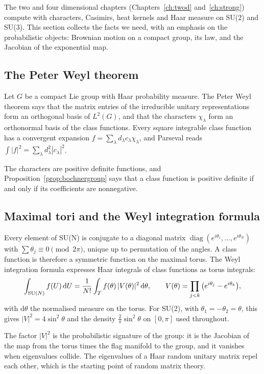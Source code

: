 The two and four dimensional chapters (Chapters~\ref{ch:twod} and~\ref{ch:strong}) compute with characters, Casimirs, heat kernels and Haar measure on SU(2) and SU(3). This section collects the facts we need, with an emphasis on the probabilistic objects: Brownian motion on a compact group, its law, and the Jacobian of the exponential map.

\subsection{The Peter Weyl theorem}\label{sec:peterweyl}

Let $G$ be a compact Lie group with Haar probability measure. The Peter Weyl theorem says that the matrix entries of the irreducible unitary representations form an orthogonal basis of $L^2(G)$, and that the characters $\chi_\lambda$ form an orthonormal basis of the class functions. Every square integrable class function has a convergent expansion $f=\sum_\lambda d_\lambda c_\lambda\chi_\lambda$, and Parseval reads $\int|f|^2=\sum_\lambda d_\lambda^2|c_\lambda|^2$.

The characters are positive definite functions, and Proposition~\ref{prop:bochnergroup} says that a class function is positive definite if and only if its coefficients are nonnegative.

\subsection{Maximal tori and the Weyl integration formula}\label{sec:weylint}

Every element of SU(N) is conjugate to a diagonal matrix $\operatorname{diag}(e^{i\theta_1},\dots,e^{i\theta_N})$ with $\sum\theta_j\equiv0\pmod{2\pi}$, unique up to permutation of the angles. A class function is therefore a symmetric function on the maximal torus. The Weyl integration formula expresses Haar integrals of class functions as torus integrals:
\[
\int_{\mathrm{SU}(N)}f(U)\,\mathrm dU=\frac{1}{N!}\int_{T}f(\theta)\,|V(\theta)|^2\,\mathrm d\theta,\qquad V(\theta)=\prod_{j<k}\big(e^{i\theta_j}-e^{i\theta_k}\big),
\]
with $\mathrm d\theta$ the normalised measure on the torus. For SU(2), with $\theta_1=-\theta_2=\theta$, this gives $|V|^2=4\sin^2\theta$ and the density $\frac2\pi\sin^2\theta$ on $[0,\pi]$ used throughout.

The factor $|V|^2$ is the probabilistic signature of the group: it is the Jacobian of the map from the torus times the flag manifold to the group, and it vanishes when eigenvalues collide. The eigenvalues of a Haar random unitary matrix repel each other, which is the starting point of random matrix theory.


